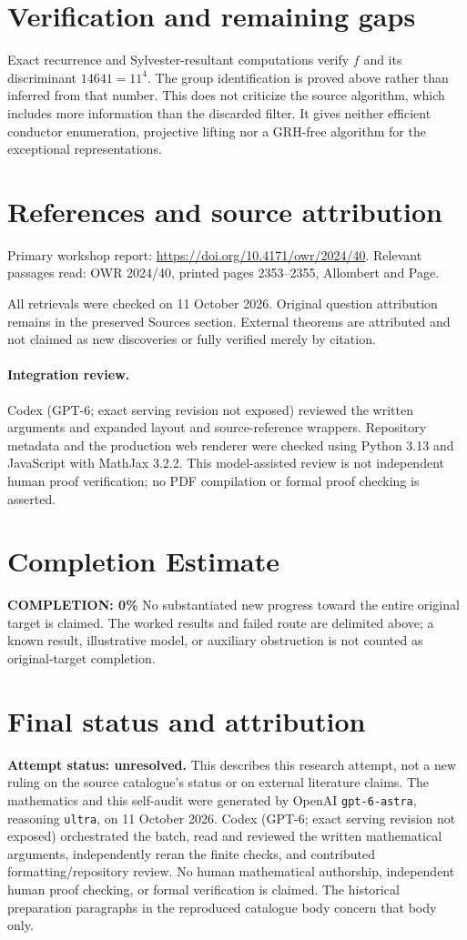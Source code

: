\documentclass[11pt]{article}
\begin{document}
\section{Verification and remaining gaps}
Exact recurrence and Sylvester-resultant computations verify $f$ and its discriminant $14641=11^4$. The group identification is proved above rather than inferred from that number. This does not criticize the source algorithm, which includes more information than the discarded filter. It gives neither efficient conductor enumeration, projective lifting nor a GRH-free algorithm for the exceptional representations.

\section{References and source attribution}
Primary workshop report: \url{https://doi.org/10.4171/owr/2024/40}. Relevant passages read: OWR 2024/40, printed pages 2353--2355, Allombert and Page.

All retrievals were checked on 11 October 2026. Original question attribution remains in the preserved Sources section. External theorems are attributed and not claimed as new discoveries or fully verified merely by citation.


\paragraph{Integration review.} Codex (GPT-6; exact serving revision not exposed) reviewed the written arguments and expanded layout and source-reference wrappers. Repository metadata and the production web renderer were checked using Python 3.13 and JavaScript with MathJax 3.2.2. This model-assisted review is not independent human proof verification; no PDF compilation or formal proof checking is asserted.

\section{Completion Estimate}
\noindent\textbf{COMPLETION: 0\%}
No substantiated new progress toward the entire original target is claimed. The worked results and failed route are delimited above; a known result, illustrative model, or auxiliary obstruction is not counted as original-target completion.

\section{Final status and attribution}
\textbf{Attempt status: unresolved.} This describes this research attempt, not a new ruling on the source catalogue's status or on external literature claims.
The mathematics and this self-audit were generated by OpenAI \texttt{gpt-6-astra}, reasoning \texttt{ultra}, on 11 October 2026. Codex (GPT-6; exact serving revision not exposed) orchestrated the batch, read and reviewed the written mathematical arguments, independently reran the finite checks, and contributed formatting/repository review. No human mathematical authorship, independent human proof checking, or formal verification is claimed. The historical preparation paragraphs in the reproduced catalogue body concern that body only.
\end{document}
